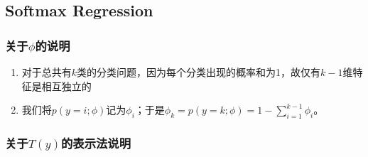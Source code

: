 \subsection{Softmax Regression}
\subsubsection{关于$\phi$的说明}
\begin{enumerate}
	\item 对于总共有$k$类的分类问题，因为每个分类出现的概率和为1，故仅有$k-1$维特征是相互独立的
	\item 我们将$p(y=i;\phi)$记为$\phi_i$；于是$\phi_k=p(y=k;\phi)=1-\sum_{i=1}^{k-1}\phi_i$。
\end{enumerate}

\subsubsection{关于$T(y)$的表示法说明}
